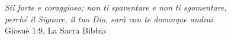 \begin{titlepage}

\nonumber
\null {}
	\begin{flushright}
\textit{Sii forte e coraggioso; non ti spaventare e non ti sgomentare,\\perché il Signore, il tuo Dio, sarà con te dovunque andrai.} \\[5mm]
	Giosuè 1:9, La Sacra Bibbia
	\end{flushright}
\null

\end{titlepage}
\cleardoublepage